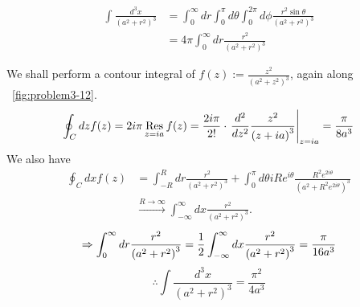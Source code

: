 \item

\begin{align*}
	\int \frac{d^3 x}{{\left( a^2 + r^2 \right)}^3}
	 & = \int_0^\infty dr \int_0^\pi d\theta \int_0^{2\pi} d\phi \frac{r^2 \sin\theta}{{\left( a^2 + r^2 \right)}^3} \\
	 & = 4\pi \int_0^\infty dr \frac{r^2}{{\left( a^2 + r^2 \right)}^3}
\end{align*}

We shall perform a contour integral of $f(z) := \frac{z^2}{{\left( a^2 + z^2 \right)}^3}$, again along ~\ref{fig:problem3-12}.
\[
	\oint_C dz f(z)
	= 2i\pi \mathop{\mathrm{Res}}_{z = ia} f(z)
	= \frac{2i\pi}{2!} \cdot {\left. \frac{d^2}{dz^2} \frac{z^2}{{\left( z + ia \right)}^3} \right|}_{z = ia}
	= \frac{\pi}{8a^3}
\]
We also have
\begin{align*}
	\oint_C dx f(z)
	 & = \int_{-R}^{R} dr \frac{r^2}{{\left( a^2 + r^2 \right)}^3}
	+\int_0^{\pi} d\theta iRe^{i\theta} \frac{R^2 e^{2i\theta}}{{\left( a^2 + R^2 e^{2i\theta} \right)}^3}     \\
	 & \xrightarrow{R \rightarrow \infty} \int_{-\infty}^{\infty} dx \frac{r^2}{{\left( a^2 + r^2 \right)}^3}.
\end{align*}
\[
	\Rightarrow \int_{0}^{\infty} dr \frac{r^2}{{\left( a^2 + r^2 \right)}^3}
	= \frac{1}{2} \int_{-\infty}^{\infty} dx \frac{r^2}{{\left( a^2 + r^2 \right)}^3}
	= \frac{\pi}{16a^3}
\]
\[
	\therefore \int \frac{d^3 x}{{\left( a^2 + r^2 \right)}^3} = \frac{\pi^2}{4a^3}
\]